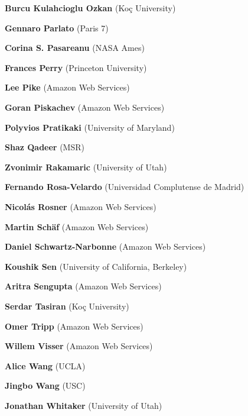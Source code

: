 \documentclass{article}
\begin{document}
\begin{commalist}
    \item {\bf Burcu Kulahcioglu Ozkan} (Koç University)


    \item {\bf Gennaro Parlato} (Paris 7)


    \item {\bf Corina S. Pasareanu} (NASA Ames)


    \item {\bf Frances Perry} (Princeton University)


    \item {\bf Lee Pike} (Amazon Web Services)


    \item {\bf Goran Piskachev} (Amazon Web Services)


    \item {\bf Polyvios Pratikaki} (University of Maryland)


    \item {\bf Shaz Qadeer} (MSR)


    \item {\bf Zvonimir Rakamaric} (University of Utah)


    \item {\bf Fernando Rosa-Velardo} (Universidad Complutense de Madrid)


    \item {\bf Nicolás Rosner} (Amazon Web Services)


    \item {\bf Martin Schäf} (Amazon Web Services)


    \item {\bf Daniel Schwartz-Narbonne} (Amazon Web Services)


    \item {\bf Koushik Sen} (University of California, Berkeley)


    \item {\bf Aritra Sengupta} (Amazon Web Services)


    \item {\bf Serdar Tasiran} (Koç University)


    \item {\bf Omer Tripp} (Amazon Web Services)


    \item {\bf Willem Visser} (Amazon Web Services)


    \item {\bf Alice Wang} (UCLA)


    \item {\bf Jingbo Wang} (USC)


    \item {\bf Jonathan Whitaker} (University of Utah)

  \end{commalist}
\end{document}
